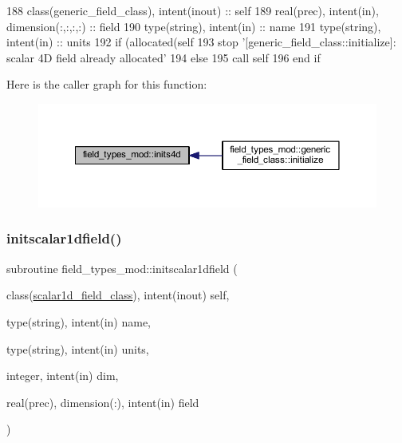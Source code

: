 \begin{DoxyCode}
188     \textcolor{keywordtype}{class}(generic\_field\_class), \textcolor{keywordtype}{intent(inout)} :: self
189     \textcolor{keywordtype}{real(prec)}, \textcolor{keywordtype}{intent(in)}, \textcolor{keywordtype}{dimension(:,:,:,:)} :: field
190     \textcolor{keywordtype}{type}(string), \textcolor{keywordtype}{intent(in)} :: name
191     \textcolor{keywordtype}{type}(string), \textcolor{keywordtype}{intent(in)} :: units
192     \textcolor{keywordflow}{if} (\textcolor{keyword}{allocated}(self%
193         stop \textcolor{stringliteral}{'[generic\_field\_class::initialize]: scalar 4D field already allocated'}
194     \textcolor{keywordflow}{else}
195         \textcolor{keyword}{call }self%
196 \textcolor{keywordflow}{    end if}
\end{DoxyCode}
Here is the caller graph for this function\+:\nopagebreak
\begin{figure}[H]
\begin{center}
\leavevmode
\includegraphics[width=350pt]{namespacefield__types__mod_a0499b29bbd4e4628fe73678cf554d918_icgraph}
\end{center}
\end{figure}
\mbox{\label{namespacefield__types__mod_a40667ebd7c9f62482c267e794a14eff4}} 
\subsubsection{\texorpdfstring{initscalar1dfield()}{initscalar1dfield()}}
{\footnotesize\ttfamily subroutine field\+\_\+types\+\_\+mod\+::initscalar1dfield (\begin{DoxyParamCaption}\item[{class(\mbox{\hyperlink{structfield__types__mod_1_1scalar1d__field__class}{scalar1d\+\_\+field\+\_\+class}}), intent(inout)}]{self,  }\item[{type(string), intent(in)}]{name,  }\item[{type(string), intent(in)}]{units,  }\item[{integer, intent(in)}]{dim,  }\item[{real(prec), dimension(\+:), intent(in)}]{field }\end{DoxyParamCaption})\hspace{0.3cm}{\ttfamily [private]}}



